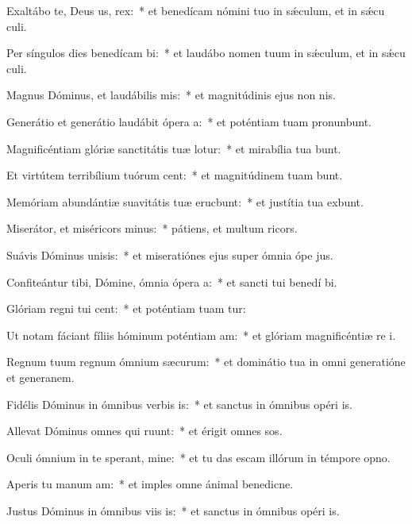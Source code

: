 \item Exaltábo te, Deus us, rex:~* et benedícam nómini tuo in sǽculum, et in sǽcu culi.
\item Per síngulos dies benedícam bi:~* et laudábo nomen tuum in sǽculum, et in sǽcu culi.
\item Magnus Dóminus, et laudábilis mis:~* et magnitúdinis ejus non  nis.
\item Generátio et generátio laudábit ópera a:~* et poténtiam tuam pronunbunt.
\item Magnificéntiam glóriæ sanctitátis tuæ lotur:~* et mirabília tua bunt.
\item Et virtútem terribílium tuórum cent:~* et magnitúdinem tuam bunt.
\item Memóriam abundántiæ suavitátis tuæ erucbunt:~* et justítia tua exbunt.
\item Miserátor, et miséricors minus:~* pátiens, et multum ricors.
\item Suávis Dóminus unisis:~* et miseratiónes ejus super ómnia ópe jus.
\item Confiteántur tibi, Dómine, ómnia ópera a:~* et sancti tui benedí bi.
\item Glóriam regni tui cent:~* et poténtiam tuam tur:
\item Ut notam fáciant fíliis hóminum poténtiam am:~* et glóriam magnificéntiæ re i.
\item Regnum tuum regnum ómnium sæcurum:~* et dominátio tua in omni generatióne et generanem.
\item Fidélis Dóminus in ómnibus verbis is:~* et sanctus in ómnibus opéri is.
\item Allevat Dóminus omnes qui ruunt:~* et érigit omnes sos.
\item Oculi ómnium in te sperant, mine:~* et tu das escam illórum in témpore opno.
\item Aperis tu manum am:~* et imples omne ánimal benedicne.
\item Justus Dóminus in ómnibus viis is:~* et sanctus in ómnibus opéri is.
